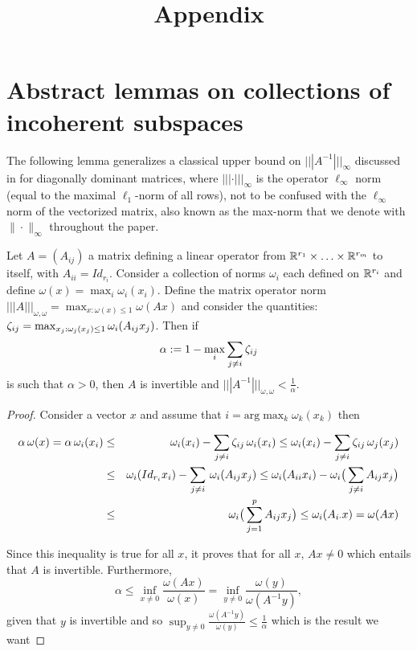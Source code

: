 \documentclass{article}
\title{Appendix}
\date{}
\author{}
\begin{document}
\maketitle
\appendix


\section{Abstract lemmas on collections of incoherent subspaces}
The following lemma generalizes a classical upper bound on $|||A^{-1}|||_{\infty}$ discussed in \citet{varga1976diagonal} for diagonally dominant matrices, where $|||\cdot|||_{\infty}$ is the operator $\ell_\infty$ norm (equal to the maximal $\ell_1$-norm of all rows), not to be confused with the 
$\ell_\infty$ norm of the vectorized matrix, also known as the max-norm that we denote with $\|\cdot\|_{\infty}$ throughout the paper.

\begin{lemma}
\label{lem:gbdd}
Let $A=(A_{ij})$ a matrix defining a linear operator from $\mathbb{R}^{r_1} \times \ldots \times \mathbb{R}^{r_m}$ to itself, with $A_{ii}=Id_{r_i}$. Consider a collection of norms $\omega_i$ each defined on $\mathbb{R}^{r_i}$
and define $\omega(x)=\max_i \omega_i(x_i)$. Define the matrix operator norm $|||A|||_{\omega,\omega}=\max_{x:\omega(x)\leq 1} \omega(Ax)$ and consider the quantities:
$\zeta_{ij}=\max_{x_j:\omega_j(x_j) \leq 1} \omega_i(A_{ij}x_j)$.
Then if 
$$\alpha:=1-\max_{i} \sum_{j \neq i} \zeta_{ij}$$ is such that $\alpha >0$, then $A$ is invertible and $|||A^{-1}|||_{\omega,\omega}< \frac{1}{\alpha}$.
\end{lemma}
\begin{proof}
Consider a vector $x$ and assume that $i=\text{arg} \max_{k} \omega_k(x_k)$ then

\begin{eqnarray*}
\alpha \, \omega(x) =\alpha \, \omega_i(x_i) &\leq & \omega_i(x_i) -\sum_{j\neq i} \zeta_{ij}  \, \omega_i(x_i) \leq \omega_i(x_i) -\sum_{j\neq i} \zeta_{ij}  \, \omega_j(x_j)\\
&\leq& \omega_i(Id_{r_i} x_i) -\sum_{j\neq i} \, \omega_i(A_{ij} x_j)
\leq \omega_i(A_{ii} x_i) -\omega_i \big ( \sum_{j\neq i} A_{ij} x_j \big )\\
&\leq&\omega_i \big ( \sum_{j=1}^p A_{ij} x_j \big )
\leq\omega_i (A_{i\cdot}x)=\omega(A x)\\
\end{eqnarray*}

Since this inequality is true for all $x$, it proves that for all $x$, $Ax\neq0$ which entails that $A$ is invertible.
Furthermore,
$$\alpha\leq \inf_{x\neq 0} \frac{\omega(A x)}{\omega(x)}=\inf_{y\neq 0} \frac{\omega(y)}{\omega(A^{-1}y)},$$
given that $y$ is invertible and so $\sup_{y \neq 0}\frac{\omega(A^{-1}y)}{\omega(y)}\leq \frac{1}{\alpha}$ which is the result we want
\end{proof}
\end{document}
